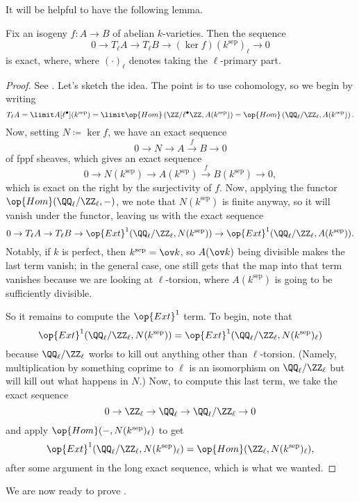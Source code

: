 \documentclass[../notes.tex]{subfiles}
\begin{document}
It will be helpful to have the following lemma.
\begin{lemma}
	Fix an isogeny $f\colon A\to B$ of abelian $k$-varieties. Then the sequence
	\[0\to T_\ell A\to T_\ell B\to(\ker f)(k^{\mathrm{sep}})_\ell\to0\]
	is exact, where, where $(\cdot)_\ell$ denotes taking the $\ell$-primary part.
\end{lemma}
\begin{proof}
	See \cite[10.5--10.6]{egm-av}. Let's sketch the idea. The point is to use cohomology, so we begin by writing
	\[T_\ell A=\limit A[\ell^\bullet](k^{\mathrm{sep}})=\limit\op{Hom}\left(\ZZ/\ell^\bullet\ZZ,A(k^{\mathrm{sep}})\right)=\op{Hom}\left(\QQ_\ell/\ZZ_\ell,A(k^{\mathrm{sep}})\right).\]
	Now, setting $N\coloneqq\ker f$, we have an exact sequence
	\[0\to N\to A\stackrel f\to B\to0\]
	of fppf sheaves, which gives an exact sequence
	\[0\to N(k^{\mathrm{sep}})\to A(k^{\mathrm{sep}})\stackrel f\to B(k^{\mathrm{sep}})\to0,\]
	which is exact on the right by the surjectivity of $f$. Now, applying the functor $\op{Hom}(\QQ_\ell/\ZZ_\ell,-)$, we note that $N(k^{\mathrm{sep}})$ is finite anyway, so it will vanish under the functor, leaving us with the exact sequence
	\[0\to T_\ell A\to T_\ell B\to\op{Ext}^1(\QQ_\ell/\ZZ_\ell,N(k^{\mathrm{sep}}))\to\op{Ext}^1(\QQ_\ell/\ZZ_\ell,A(k^{\mathrm{sep}})).\]
	Notably, if $k$ is perfect, then $k^{\mathrm{sep}}=\ov k$, so $A(\ov k)$ being divisible makes the last term vanish; in the general case, one still gets that the map into that term vanishes because we are looking at $\ell$-torsion, where $A(k^{\mathrm{sep}})$ is going to be sufficiently divisible.

	So it remains to compute the $\op{Ext}^1$ term. To begin, note that
	\[\op{Ext}^1(\QQ_\ell/\ZZ_\ell,N(k^{\mathrm{sep}}))=\op{Ext}^1(\QQ_\ell/\ZZ_\ell,N(k^{\mathrm{sep}})_\ell)\]
	because $\QQ_\ell/\ZZ_\ell$ works to kill out anything other than $\ell$-torsion. (Namely, multiplication by something coprime to $\ell$ is an isomorphism on $\QQ_\ell/\ZZ_\ell$ but will kill out what happens in $N$.) Now, to compute this last term, we take the exact sequence
	\[0\to\ZZ_\ell\to\QQ_\ell\to\QQ_\ell/\ZZ_\ell\to0\]
	and apply $\op{Hom}(-,N(k^{\mathrm{sep}})_\ell)$ to get
	\[\op{Ext}^1(\QQ_\ell/\ZZ_\ell,N(k^{\mathrm{sep}})_\ell)=\op{Hom}(\ZZ_\ell,N(k^{\mathrm{sep}})_\ell),\]
	after some argument in the long exact sequence, which is what we wanted.
\end{proof}
We are now ready to prove .
\end{document}
